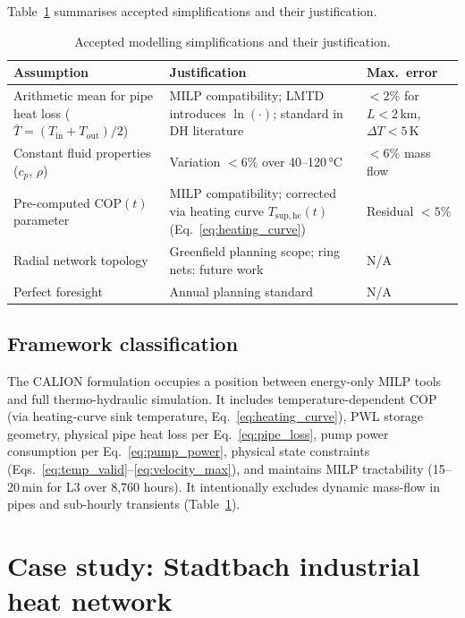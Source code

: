\documentclass[a4paper,fleqn]{cas-dc}
\begin{document}
Table~\ref{tab:assumptions} summarises accepted simplifications and their justification.

\begin{table}[h]
\centering
\caption{Accepted modelling simplifications and their justification.}
\label{tab:assumptions}
\begin{tabular}{p{4.2cm}p{5.0cm}p{2.8cm}}
\toprule
Assumption & Justification & Max.\ error \\
\midrule
Arithmetic mean for pipe heat loss
  ($\bar{T} = (T_\mathrm{in}+T_\mathrm{out})/2$)
  & MILP compatibility; LMTD introduces $\ln(\cdot)$; standard in DH literature~\citep{Frederiksen2013}
  & ${<}2\%$ for $L{<}2$\,km, $\Delta T{<}5$\,K \\
Constant fluid properties ($c_p$, $\rho$)
  & Variation ${<}6\%$ over 40--120\,\si{\degreeCelsius}
  & ${<}6\%$ mass flow \\
Pre-computed $\mathrm{COP}(t)$ parameter
  & MILP compatibility; corrected via heating curve $T_{\mathrm{sup,hc}}(t)$ (Eq.~\ref{eq:heating_curve})
  & Residual ${<}5\%$ \\
Radial network topology
  & Greenfield planning scope; ring nets: future work
  & N/A \\
Perfect foresight
  & Annual planning standard~\citep{Frederiksen2013}
  & N/A \\
\bottomrule
\end{tabular}
\end{table}

\subsection{Framework classification}

The CALION formulation occupies a position between energy-only MILP tools and full thermo-hydraulic simulation. It includes temperature-dependent COP (via heating-curve sink temperature, Eq.~\ref{eq:heating_curve}), PWL storage geometry, physical pipe heat loss per Eq.~\eqref{eq:pipe_loss}, pump power consumption per Eq.~\eqref{eq:pump_power}, physical state constraints (Eqs.~\ref{eq:temp_valid}--\ref{eq:velocity_max}), and maintains MILP tractability (15--20\,min for L3 over 8,760 hours). It intentionally excludes dynamic mass-flow in pipes and sub-hourly transients (Table~\ref{tab:assumptions}).


\section{Case study: Stadtbach industrial heat network}\label{sec:casestudy}
\end{document}
